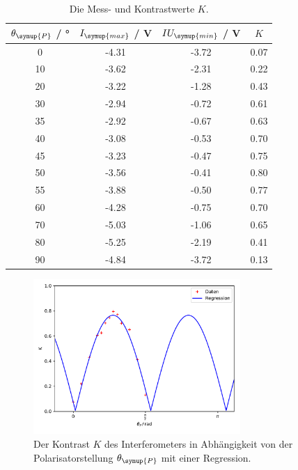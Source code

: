 \documentclass[
  bibliography=totoc,     %
  captions=tableheading,  %
  titlepage=firstiscover, %
]{scrartcl}
\begin{document}
\begin{table}[h!]
  \centering
  \caption{Die Mess- und Kontrastwerte $K$.}
  \label{A_tab:1}
  \begin{tabular}{c c c c}
    \toprule
    $\theta_{\symup{P}}$ / \si{\degree} & $I_{\symup{max}}$ / \si{\volt} &
    $IU_{\symup{min}}$ / \si{\volt} & $K$\\
    \midrule
    0 & -4.31 & -3.72 & 0.07 \\
    10 & -3.62 & -2.31 & 0.22 \\
    20 & -3.22 & -1.28 & 0.43 \\
    30 & -2.94 & -0.72 & 0.61 \\
    35 & -2.92 & -0.67 & 0.63 \\
    40 & -3.08 & -0.53 & 0.70 \\
    45 & -3.23 & -0.47 & 0.75 \\
    50 & -3.56 & -0.41 & 0.80 \\
    55 & -3.88 & -0.50 & 0.77 \\
    60 & -4.28 & -0.75 & 0.70 \\
    70 & -5.03 & -1.06 & 0.65 \\
    80 & -5.25 & -2.19 & 0.41 \\
    90 & -4.84 & -3.72 & 0.13 \\
    \bottomrule
  \end{tabular}
\end{table}

\begin{figure}[h!]
  \centering
  \includegraphics[width=0.7\textwidth]{Kontrast.pdf}
  \caption{Der Kontrast $K$ des Interferometers in Abhängigkeit von der Polarisatorstellung
  $\theta_{\symup{P}}$ mit einer Regression.}
  \label{A_abb:1}
\end{figure}
\noindent
\end{document}
